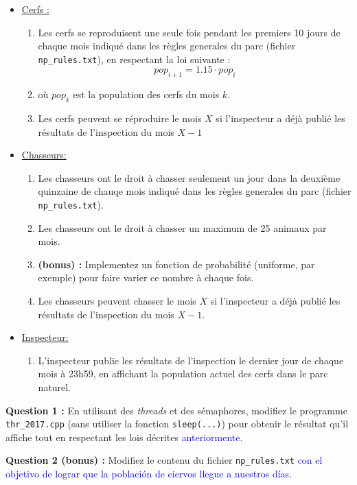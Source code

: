 \documentclass[CC,sansRappel,12pt]{tdtp-utf8}
\newcommand{\totranslate}[1]{\textcolor{blue}{#1}}
\newcommand{\tocorrect}[1]{\textcolor{dgreen}{#1}}
\begin{document}
\begin{feuille}
\begin{exercice}
\begin{itemize}
\item \underline{Cerfs :}
\begin{enumerate}
\item Les cerfs \tocorrect{se reproduisent une seule fois pendant les premiers 10 jours de chaque mois indiqué dans les règles generales du parc (fichier \texttt{np\_rules.txt}), en respectant la loi suivante :} $$pop_{i+1} = 1.15\cdot pop_{i}$$
\item[] où $pop_k$ est la population des cerfs du mois $k$.
\item Les cerfs \tocorrect{peuvent se réproduire le mois $X$ si l'inspecteur a déjà publié les résultats de l'inspection du mois $X-1$}
\end{enumerate}
\item \underline{Chasseurs:}
\begin{enumerate}
\item Les chasseurs \tocorrect{ont le droit à chasser seulement un jour dans la deuxième quinzaine de chauqe mois indiqué dans les règles generales du parc (fichier \texttt{np\_rules.txt}).}
\item Les chasseurs \tocorrect{ont le droit à chasser un maximum de 25 animaux par mois.}
\item[] \textbf{(bonus) : } \tocorrect{Implementez un fonction de probabilité (uniforme, par exemple) pour faire varier ce nombre à chaque fois.}
\item Les chasseurs \tocorrect{peuvent chasser le mois $X$ si l'inspecteur a déjà publié les résultats de l'inspection du mois $X-1$.}
\end{enumerate}
\item \underline{Inspecteur:}
\begin{enumerate}
\item L'inspecteur \tocorrect{publie les résultats de l'inspection le dernier jour de chaque mois à 23h59, en affichant la population actuel des cerfs dans le parc naturel.}
\end{enumerate}
\end{itemize}

\textbf{Question 1 : } \tocorrect{En utilisant des \textit{threads} et des sémaphores, modifiez le programme \texttt{thr\_2017.cpp} (sans utiliser la fonction \texttt{sleep(...)}) pour obtenir le résultat qu'il affiche tout en respectant les lois décrites} \totranslate{anteriormente}.

\textbf{Question 2 (bonus) :} \tocorrect{Modifiez le contenu du fichier \texttt{np\_rules.txt} } \totranslate{con el objetivo de lograr que la población de ciervos llegue a nuestros días.}


\end{exercice}
\end{feuille}
\end{document}
